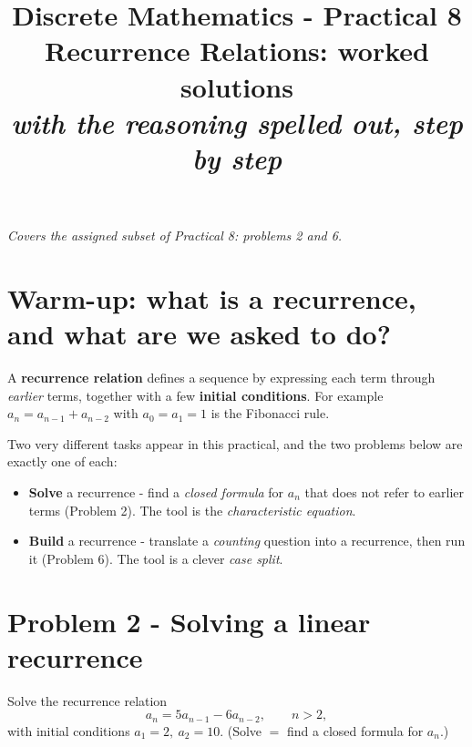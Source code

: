 \documentclass[11pt,a4paper]{article}
\title{\vspace{-1.2cm}\textbf{Discrete Mathematics - Practical 8}\\[2pt]
\large Recurrence Relations: worked solutions\\[2pt]
\normalsize\itshape with the reasoning spelled out, step by step}
\author{}
\date{}
\begin{document}
\maketitle
\vspace{-1.0cm}

\begin{center}\small\itshape Covers the assigned subset of Practical 8: problems 2 and 6.\end{center}

\section*{Warm-up: what is a recurrence, and what are we asked to do?}

A \textbf{recurrence relation} defines a sequence by expressing each term through
\emph{earlier} terms, together with a few \textbf{initial conditions}. For example
$a_{n}=a_{n-1}+a_{n-2}$ with $a_0=a_1=1$ is the Fibonacci rule.

Two very different tasks appear in this practical, and the two problems below are
exactly one of each:

\begin{itemize}[leftmargin=1.4em,itemsep=2pt]
  \item \textbf{Solve} a recurrence - find a \emph{closed formula} for $a_n$ that does
        not refer to earlier terms (Problem 2). The tool is the
        \emph{characteristic equation}.
  \item \textbf{Build} a recurrence - translate a \emph{counting} question into a
        recurrence, then run it (Problem 6). The tool is a clever \emph{case split}.
\end{itemize}

\section*{Problem 2 - Solving a linear recurrence}

\begin{problembox}[2]
Solve the recurrence relation
\[
a_n = 5a_{n-1} - 6a_{n-2},\qquad n>2,
\]
with initial conditions $a_1=2,\ a_2=10$. (\textquotedbl{}Solve\textquotedbl{} $=$ find a closed formula for $a_n$.)
\end{problembox}
\end{document}
